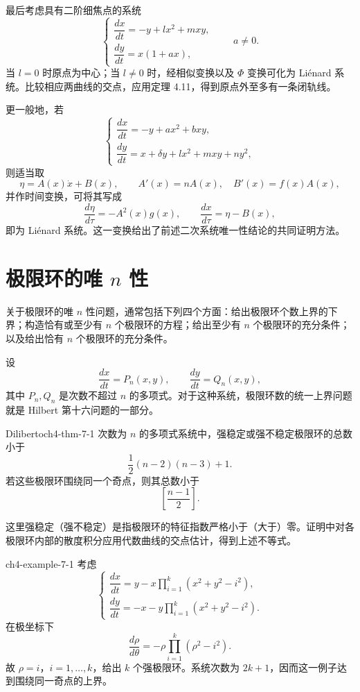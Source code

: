 最后考虑具有二阶细焦点的系统
\begin{equation}
\begin{cases}
\dfrac{dx}{dt}=-y+lx^2+mxy,\\
\dfrac{dy}{dt}=x(1+ax),
\end{cases}\qquad a\ne0.\tag{6.8}
\end{equation}
当 \(l=0\) 时原点为中心；当 \(l\ne0\) 时，经相似变换以及 \(\Phi\) 变换可化为 Liénard 系统。比较相应两曲线的交点，应用定理 4.11，得到原点外至多有一条闭轨线。

更一般地，若
\begin{equation}
\begin{cases}
\dfrac{dx}{dt}=-y+ax^2+bxy,\\
\dfrac{dy}{dt}=x+\delta y+lx^2+mxy+ny^2,
\end{cases}\tag{6.9}
\end{equation}
则适当取
\[
\eta=A(x)\dot{x}+B(x),\qquad A'(x)=nA(x),\quad B'(x)=f(x)A(x),
\]
并作时间变换，可将其写成
\[
\dfrac{d\eta}{d\tau}=-A^2(x)g(x),\qquad
\dfrac{dx}{d\tau}=\eta-B(x),
\]
即为 Liénard 系统。这一变换给出了前述二次系统唯一性结论的共同证明方法。

\section{极限环的唯 $n$ 性}

关于极限环的唯 $n$ 性问题，通常包括下列四个方面：给出极限环个数上界的下界；构造恰有或至少有 $n$ 个极限环的方程；给出至少有 $n$ 个极限环的充分条件；以及给出恰有 $n$ 个极限环的充分条件。

设
\[
\dfrac{dx}{dt}=P_n(x,y),\qquad \dfrac{dy}{dt}=Q_n(x,y),
\]
其中 $P_n,Q_n$ 是次数不超过 $n$ 的多项式。对于这种系统，极限环数的统一上界问题就是 Hilbert 第十六问题的一部分。

\begin{theorem}{Diliberto}{ch4-thm-7-1}
次数为 $n$ 的多项式系统中，强稳定或强不稳定极限环的总数小于
\[
\dfrac12(n-2)(n-3)+1.
\]
若这些极限环围绕同一个奇点，则其总数小于
\[
\left[\dfrac{n-1}{2}\right].
\]
\end{theorem}

这里强稳定（强不稳定）是指极限环的特征指数严格小于（大于）零。证明中对各极限环内部的散度积分应用代数曲线的交点估计，得到上述不等式。


\begin{example}{ }{ch4-example-7-1}
考虑
\[
\begin{cases}
\dfrac{dx}{dt}=y-x\displaystyle\prod_{i=1}^{k}(x^2+y^2-i^2),\\
\dfrac{dy}{dt}=-x-y\displaystyle\prod_{i=1}^{k}(x^2+y^2-i^2).
\end{cases}
\]
在极坐标下
\[
\dfrac{d\rho}{d\theta}=-\rho\prod_{i=1}^{k}(\rho^2-i^2).
\]
故 $\rho=i$，$i=1,\ldots,k$，给出 $k$ 个强极限环。系统次数为 $2k+1$，因而这一例子达到围绕同一奇点的上界。
\end{example}

